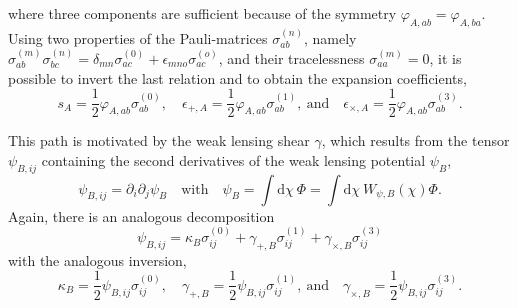 \documentclass[a4paper,fleqn,usenatbib]{mnras}
\newcommand{\dd}{\mathrm{d}}
\begin{document}
where three components are sufficient because of the symmetry $\varphi_{A,ab} = \varphi_{A,ba}$. Using two properties of the Pauli-matrices $\sigma_{ab}^{(n)}$, namely $\sigma_{ab}^{(m)}\sigma_{bc}^{(n)} = \delta_{mn}\sigma^{(0)}_{ac} + \epsilon_{mno}\sigma^{(o)}_{ac}$, and their tracelessness $\sigma^{(m)}_{aa} = 0$, it is possible to invert the last relation and to obtain the expansion coefficients,
\begin{equation}
s_A = \frac{1}{2}\varphi_{A,ab}\sigma^{(0)}_{ab},
\quad
\epsilon_{+,A} = \frac{1}{2}\varphi_{A,ab}\sigma^{(1)}_{ab},
\mathrm{~and}\quad
\epsilon_{\times,A} = \frac{1}{2}\varphi_{A,ab}\sigma^{(3)}_{ab}.
\end{equation}

This path is motivated by the weak lensing shear $\gamma$, which results from the tensor $\psi_{B,ij}$ containing the second derivatives of the weak lensing potential $\psi_B$,
\begin{equation}
\psi_{B,ij} = \partial_i\partial_j\psi_B
\quad\mathrm{with}\quad
\psi_B = \int\dd\chi\:\Phi = \int\dd\chi\:W_{\psi,B}(\chi)\Phi.
\end{equation}
Again, there is an analogous decomposition
\begin{equation}
\psi_{B,ij} = \kappa_B\sigma^{(0)}_{ij} + \gamma_{+,B}\sigma^{(1)}_{ij} +\gamma_{\times,B}\sigma^{(3)}_{ij}
\end{equation}
with the analogous inversion,
\begin{equation}
\kappa_B = \frac{1}{2}\psi_{B,ij}\sigma^{(0)}_{ij},
\quad
\gamma_{+,B} = \frac{1}{2}\psi_{B,ij}\sigma^{(1)}_{ij},
\mathrm{~and}\quad
\gamma_{\times,B} = \frac{1}{2}\psi_{B,ij}\sigma^{(3)}_{ij}.
\end{equation}
\end{document}
